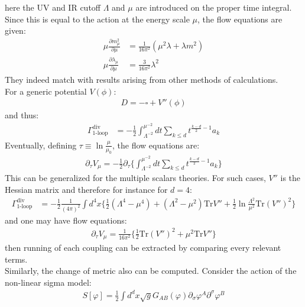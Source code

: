 \documentclass[fleqn]{article}
\begin{document}
here the UV and IR cutoff $\Lambda$ and $\mu$ are introduced on the proper time integral. Since this is equal to the action at the energy scale $\mu$, the flow equations are given:
\begin{align}
\mu \frac{\partial m_{\mu}^{2}}{\partial \mu} & = \frac{1}{16\pi ^{2}} (\mu ^{2} \lambda + \lambda m^{2}) \\
\mu \frac{\partial \lambda _{\mu}} {\partial \mu} &= \frac{3}{16\pi ^{2}} \lambda ^{2}  
\end{align}
They indeed match with results arising from other methods of calculations. \\
\indent For a generic potential $V(\phi)$:
\begin{align}
D = -\square + V''(\phi)
\end{align}
and thus:
\begin{align}
\Gamma _{\text{1-loop}}^ {\text{div}} &= -\frac{1}{2} \int _{\Lambda ^{-2}} ^{\mu ^{-2}} dt \sum _{k \leq d} t^{\frac{k-d}{2} -1} a_{k} 
\end{align}
Eventually, defining $\tau \equiv \ln \frac{\mu}{\mu_{0}}$, the flow equations are:
\begin{align}
\partial _{\tau} V_{\mu} = -\frac{1}{2} \partial _{\tau} \lbrace \int _{\Lambda ^{-2} } ^{\mu ^{-2}} dt \sum _{k \leq d} t^{\frac{k-d}{2} -1} a_k \rbrace 
\end{align}
This can be generalized for the multiple scalars theories. For such cases, $V''$ is the Hessian matrix and therefore for instance for $d=4$:
\begin{align}
\Gamma _{\text{1-loop}}^{\text{div}} &= -\frac{1}{2} \frac{1}{(4\pi)^{2}} \int d^{4}x\lbrace \frac{1}{2} (\Lambda ^{4} - \mu^{4}) + (\Lambda ^{2} - \mu ^{2})\text{Tr} V'' + \frac{1}{2} \ln \frac{\Lambda ^{2}} {\mu ^{2}} \text{Tr} (V'')^2 \rbrace 
\end{align}
and one may have flow equations:
\begin{align}
\partial _{\tau} V_{\mu} = \frac{1}{16\pi ^{2}} \lbrace \frac{1}{2} \text{Tr} (V'')^2 + \mu ^{2} \text{Tr} V'' \rbrace
\end{align}
then running of each coupling can be extracted by comparing every relevant terms. \\
\indent Similarly, the change of metric also can be computed. Consider the action of the non-linear sigma model:
\begin{align}
S[\varphi]  = \frac{1}{2} \int d^{d} x \sqrt{g} G_{AB}(\varphi) \partial _{\sigma} \varphi ^{A} \partial ^{\sigma} \varphi ^{B}
\end{align}
\end{document}
